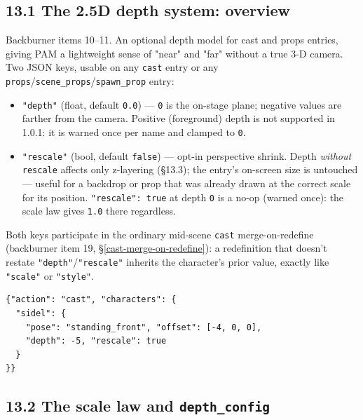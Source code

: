 \documentclass[
  11pt,
]{book}
\begin{document}
\subsection{\texorpdfstring{13.1 The 2.5D depth system: overview}{13.1 The 2.5D depth system: overview}}\label{the-2-5d-depth-system-overview}

Backburner items 10--11. An optional depth model for cast and props
entries, giving PAM a lightweight sense of "near" and "far" without a
true 3-D camera. Two JSON keys, usable on any \texttt{cast} entry or
any \texttt{props}/\texttt{scene\_props}/\texttt{spawn\_prop} entry:

\begin{itemize}
\item
  \texttt{"depth"} (float, default \texttt{0.0}) --- \texttt{0} is the
  on-stage plane; negative values are farther from the camera.
  Positive (foreground) depth is not supported in 1.0.1: it is warned
  once per name and clamped to \texttt{0}.
\item
  \texttt{"rescale"} (bool, default \texttt{false}) --- opt-in
  perspective shrink. Depth \emph{without} \texttt{rescale} affects
  only z-layering (\S13.3); the entry's on-screen size is untouched ---
  useful for a backdrop or prop that was already drawn at the correct
  scale for its position. \texttt{"rescale": true} at depth \texttt{0}
  is a no-op (warned once): the scale law gives \texttt{1.0} there
  regardless.
\end{itemize}

Both keys participate in the ordinary mid-scene \texttt{cast}
merge-on-redefine (backburner item 19,
\S\ref{cast-merge-on-redefine}): a redefinition
that doesn't restate \texttt{"depth"}/\texttt{"rescale"} inherits the
character's prior value, exactly like \texttt{"scale"} or
\texttt{"style"}.

\begin{verbatim}
{"action": "cast", "characters": {
  "sidel": {
    "pose": "standing_front", "offset": [-4, 0, 0],
    "depth": -5, "rescale": true
  }
}}
\end{verbatim}

\subsection{\texorpdfstring{13.2 The scale law and \texttt{depth\_config}}{13.2 The scale law and depth\_config}}\label{the-scale-law-and-depth-config}
\end{document}
